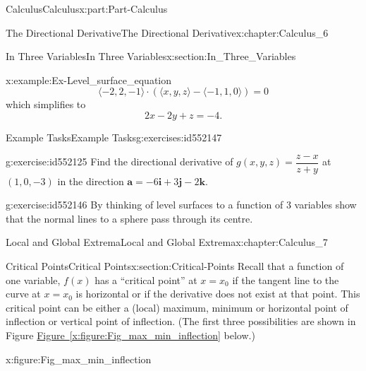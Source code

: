 \documentclass[oneside,10pt,]{book}
\newcommand{\xreffont}{\relax}
\numberwithin{equation}{section}
\newcommand{\bm}[1]{\boldsymbol{#1}}
\begin{document}
\begin{partptx}{Calculus}{}{Calculus}{}{}{x:part:Part-Calculus}
\begin{chapterptx}{The Directional Derivative}{}{The Directional Derivative}{}{}{x:chapter:Calculus_6}
\begin{sectionptx}{In Three Variables}{}{In Three Variables}{}{}{x:section:In_Three_Variables}
\begin{example}{}{x:example:Ex-Level_surface_equation}
\begin{equation*}
\langle -2, 2, -1 \rangle \cdot \left( \langle x, y, z \rangle - \langle -1, 1, 0 \rangle \right) = 0
\end{equation*}
which simplifies to%
\begin{equation*}
2x-2y+z = -4\text{.}
\end{equation*}
%
\end{example}
%
%
\typeout{************************************************}
\typeout{************************************************}
%
\begin{exercises-subsection-numberless}{Example Tasks}{}{Example Tasks}{}{}{g:exercises:id552147}
\begin{divisionexercise}{1}{}{}{g:exercise:id552125}%
Find the directional derivative of \(g(x,y,z) = \dfrac{z-x}{z+y}\) at \((1,0,-3)\) in the direction \(\bm{a} = -6\bm{i} + 3\bm{j} - 2\bm{k}\).%
\end{divisionexercise}%
\begin{divisionexercise}{2}{}{}{g:exercise:id552146}%
By thinking of level surfaces to a function of 3 variables show that the normal lines to a sphere pass through its centre.%
\end{divisionexercise}%
\end{exercises-subsection-numberless}
\end{sectionptx}
\end{chapterptx}
%
\typeout{************************************************}
\typeout{************************************************}
%
\begin{chapterptx}{Local and Global Extrema}{}{Local and Global Extrema}{}{}{x:chapter:Calculus_7}
%
%
\typeout{************************************************}
\typeout{************************************************}
%
\begin{sectionptx}{Critical Points}{}{Critical Points}{}{}{x:section:Critical-Points}
Recall  that  a  function  of  one  variable, \(f(x)\)  has  a  ``critical  point'' at \(x=x_0\) if  the tangent line to the curve at \(x=x_0\) is horizontal or if the derivative does not exist at that point. This critical point can be either a (local) maximum, minimum or horizontal point of inflection or vertical point of inflection.  (The first three possibilities are shown in Figure \hyperref[x:figure:Fig_max_min_inflection]{Figure~{\xreffont\ref{x:figure:Fig_max_min_inflection}}} below.)%
\begin{figureptx}{}{x:figure:Fig_max_min_inflection}{}%

\end{figureptx}
\end{sectionptx}
\end{chapterptx}
\end{partptx}
\end{document}
